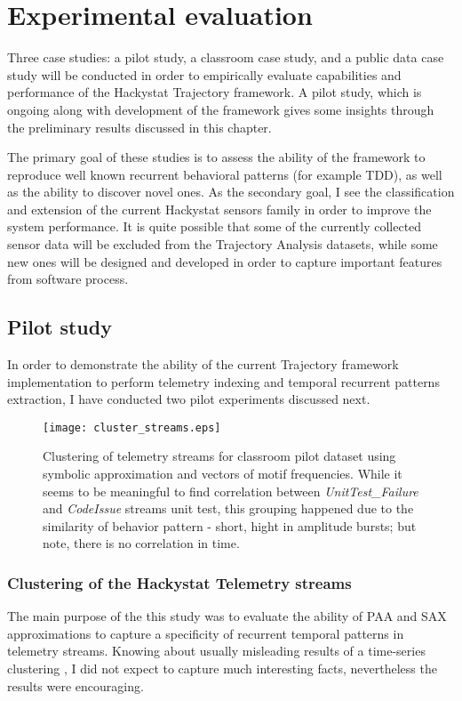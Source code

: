 \chapter{Experimental evaluation} \label{experiments}
Three case studies: a pilot study, a classroom case study, and a public data case study will be conducted in order to empirically evaluate capabilities and performance of the Hackystat Trajectory framework. A pilot study, which is ongoing along with development of the framework gives some insights through the preliminary results discussed in this chapter.

The primary goal of these studies is to assess the ability of the framework to reproduce well known recurrent behavioral patterns (for example TDD), as well as the ability to discover novel ones. As the secondary goal, I see the classification and extension of the current Hackystat sensors family in order to improve the system performance. It is quite possible that some of the currently collected sensor data will be excluded from the Trajectory Analysis datasets, while some new ones will be designed and developed in order to capture important features from software process. 

\section{Pilot study}\label{pilot.evaluation}
In order to demonstrate the ability of the current Trajectory framework implementation to perform telemetry indexing and temporal recurrent patterns extraction, I have conducted two pilot experiments discussed next. 

\begin{figure}[tbp]
   \centering
   \texttt{[image: cluster\_streams.eps]}
   \caption{Clustering of telemetry streams for classroom pilot dataset using symbolic approximation and vectors of motif frequencies. While it seems to be meaningful to find correlation between \textit{UnitTest\_Failure} and \textit{CodeIssue} streams unit test, this grouping happened due to the similarity of behavior pattern - short, hight in amplitude bursts; but note, there is no correlation in time.}
   \label{fig:cluster_streams}
\end{figure}

\subsection{Clustering of the Hackystat Telemetry streams}
The main purpose of the this study was to evaluate the ability of PAA and SAX approximations to capture a specificity of recurrent temporal patterns in telemetry streams. Knowing about usually misleading results of a time-series clustering \cite{citeulike:227029}, I did not expect to capture much interesting facts, nevertheless the results were encouraging.

